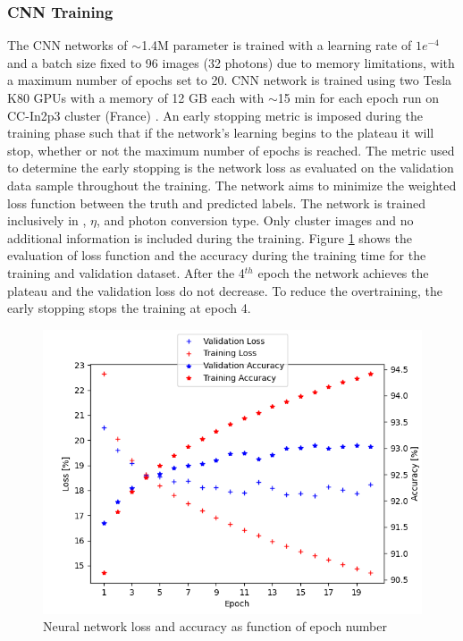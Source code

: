 \subsubsection{CNN Training}
\label{gamma:CNN:Training}
The CNN networks of $\sim$1.4M parameter is trained with a learning rate of $1e^{-4}$ and a batch size fixed to 96 images (32 photons) due to memory limitations, with a maximum number of epochs set to 20. CNN network is trained using two Tesla K80 GPUs with a memory of 12 GB each with $\sim$15 min for each epoch run on CC-In2p3 cluster (France) \cite{cca}. An early stopping metric \cite{early} is imposed during the training phase such that if the network's learning begins to the plateau it will stop, whether or not the maximum number of epochs is reached. The metric used to determine the early stopping is the network loss as evaluated on the validation data sample throughout the training. The network aims to minimize the weighted loss function between the truth and predicted labels. %
The network is trained inclusively in \eT, $\eta$, and photon conversion type. Only cluster images and no additional information is included during the training.
Figure \ref{fig:gamma:CNN:Training:loss}  shows the evaluation of loss function and the accuracy during the training time for the training and validation dataset. After the 4$^{th}$ epoch the network achieves the plateau and the validation loss do not decrease. To reduce the overtraining, the early stopping stops the training at epoch 4.
\begin{figure}[H]
    \centering
    \includegraphics[width=.7\textwidth]{Ch3/Img/CNN_Loss_Accuracy.png}
    \caption{Neural network loss and accuracy as function of epoch number}
    \label{fig:gamma:CNN:Training:loss}
\end{figure}
